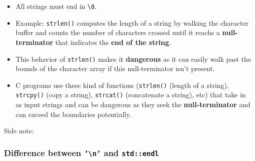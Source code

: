 \documentclass[10pt]{article}
\newcommand{\pbreak}{\vspace{30pt}}
\begin{document}
\begin{itemize}
\item All strings must end in \verb|\0|.

	\pbreak

\item Example: \verb|strlen()| computes the length of a string by walking the character buffer and counts the number of characters crossed until it reachs a \textbf{null-terminator} that indicates the \textbf{end of the string}.

\item This behavior of \verb|strlen()| makes it \textbf{dangerous} as it can easily walk past the bounds of the character array if this null-terminator isn't present.

\pbreak

\item C programs use these kind of functions (\verb|strlen()| (length of a string), \verb|strcpy()| (copy a string), \verb|strcat()| (concatenate a string), etc) that take in as input strings and can be dangerous as they seek the \textbf{null-terminator} and can exceed the boundaries potentially.


\end{itemize}

\newpage

Side note:
\subsubsection{Difference between \texttt{'\textbackslash n'} and \texttt{std::endl}}
\end{document}
